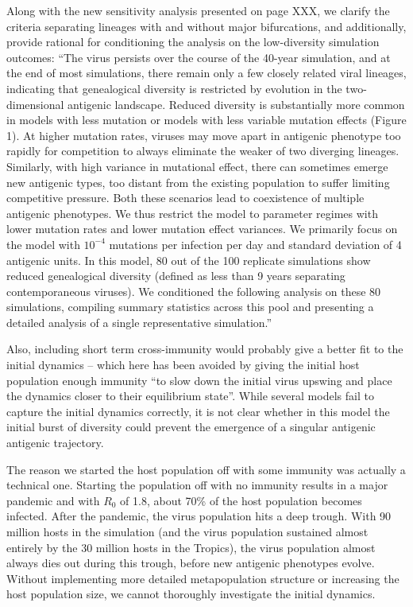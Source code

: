 \documentclass[11pt,oneside,letterpaper]{article}
\def\comment#1{
#1
}
\def\response#1{
\begin{bf}
#1
\end{bf}
}
\def\break{\vspace{0.2cm}}
\begin{document}
\response{Along with the new sensitivity analysis presented on page XXX, we clarify the criteria separating lineages with and without major bifurcations, and additionally, provide rational for conditioning the analysis on the low-diversity simulation outcomes: ``The virus persists over the course of the 40-year simulation, and at the end of most simulations, there remain only a few closely related viral lineages, indicating that genealogical diversity is restricted by evolution in the two-dimensional antigenic landscape.  Reduced diversity is substantially more common in models with less mutation or models with less variable mutation effects (Figure 1).  At higher mutation rates, viruses may move apart in antigenic phenotype too rapidly for competition to always eliminate the weaker of two diverging lineages.  Similarly, with high variance in mutational effect, there can sometimes emerge new antigenic types, too distant from the existing population to suffer limiting competitive pressure.  Both these scenarios lead to coexistence of multiple antigenic phenotypes.  We thus restrict the model to parameter regimes with lower mutation rates and lower mutation effect variances.  We primarily focus on the model with $10^{-4}$ mutations per infection per day and standard deviation of 4 antigenic units.  In this model, 80 out of the 100 replicate simulations show reduced genealogical diversity (defined as less than 9 years separating contemporaneous viruses).  We conditioned the following analysis on these 80 simulations, compiling summary statistics across this pool and presenting a detailed analysis of a single representative simulation.''}

\break

\comment{Also, including short term cross-immunity would probably give a better fit to the initial dynamics – which here has been avoided by giving the initial host population enough immunity ``to slow down the initial virus upswing and place the dynamics closer to their equilibrium state''. While several models fail to capture the initial dynamics correctly, it is not clear whether in this model the initial burst of diversity could prevent the emergence of a singular antigenic antigenic trajectory.}

\response{The reason we started the host population off with some immunity was actually a technical one.  Starting the population off with no immunity results in a major pandemic and with $R_0$ of 1.8, about 70\% of the host population becomes infected.  After the pandemic, the virus population hits a deep trough.  With 90 million hosts in the simulation (and the virus population sustained almost entirely by the 30 million hosts in the Tropics), the virus population almost always dies out during this trough, before new antigenic phenotypes evolve.  Without implementing more detailed metapopulation structure or increasing the host population size, we cannot thoroughly investigate the initial dynamics.}
\end{document}
